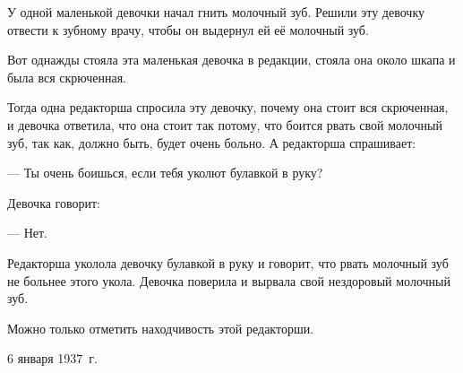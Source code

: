 У одной маленькой девочки начал гнить молочный зуб. Решили эту девочку отвести к зубному врачу, чтобы он выдернул ей её молочный зуб.

Вот однажды стояла эта маленькая девочка в редакции, стояла она около шкапа и была вся скрюченная.

Тогда одна редакторша спросила эту девочку, почему она стоит вся скрюченная, и девочка ответила, что она стоит так потому, что боится рвать свой молочный зуб, так как, должно быть, будет очень больно. А редакторша спрашивает:

--- Ты очень боишься, если тебя уколют булавкой в руку?

Девочка говорит:

--- Нет.

Редакторша уколола девочку булавкой в руку и говорит, что рвать молочный зуб не больнее этого укола. Девочка поверила и вырвала свой нездоровый молочный зуб.

Можно только отметить находчивость этой редакторши.

6 января 1937~г.